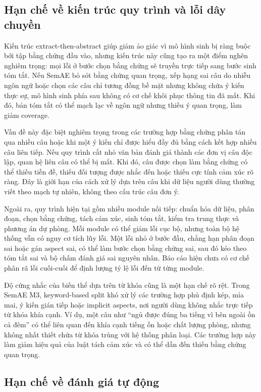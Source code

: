 \subsection{Hạn chế về kiến trúc quy trình và lỗi dây chuyền}

Kiến trúc extract-then-abstract giúp giảm ảo giác vì mô hình sinh bị ràng buộc bởi tập bằng chứng đầu vào, nhưng kiến trúc này cũng tạo ra một điểm nghẽn nghiêm trọng: mọi lỗi ở bước chọn bằng chứng sẽ truyền trực tiếp sang bước sinh tóm tắt. Nếu SemAE bỏ sót bằng chứng quan trọng, xếp hạng sai câu do nhiễu ngôn ngữ hoặc chọn các câu chỉ tương đồng bề mặt nhưng không chứa ý kiến thực sự, mô hình sinh phía sau không có cơ chế khôi phục thông tin đã mất. Khi đó, bản tóm tắt có thể mạch lạc về ngôn ngữ nhưng thiếu ý quan trọng, làm giảm coverage.

Vấn đề này đặc biệt nghiêm trọng trong các trường hợp bằng chứng phân tán qua nhiều câu hoặc khi một ý kiến chỉ được hiểu đầy đủ bằng cách kết hợp nhiều câu liên tiếp. Nếu quy trình cắt nhỏ văn bản đánh giá thành các đơn vị câu độc lập, quan hệ liên câu có thể bị mất. Khi đó, câu được chọn làm bằng chứng có thể thiếu tiền đề, thiếu đối tượng được nhắc đến hoặc thiếu cực tính cảm xúc rõ ràng. Đây là giới hạn của cách xử lý dựa trên câu khi dữ liệu người dùng thường viết theo mạch tự nhiên, không theo cấu trúc câu đơn ý.

Ngoài ra, quy trình hiện tại gồm nhiều module nối tiếp: chuẩn hóa dữ liệu, phân đoạn, chọn bằng chứng, tách cảm xúc, sinh tóm tắt, kiểm tra trung thực và phương án dự phòng. Mỗi module có thể giảm lỗi cục bộ, nhưng toàn bộ hệ thống vẫn có nguy cơ tích lũy lỗi. Một lỗi nhỏ ở bước đầu, chẳng hạn phân đoạn sai hoặc gán aspect sai, có thể làm bước chọn bằng chứng sai, sau đó kéo theo tóm tắt sai và bộ chấm đánh giá sai nguyên nhân. Báo cáo hiện chưa có cơ chế phân rã lỗi cuối-cuối để định lượng tỷ lệ lỗi đến từ từng module.

Độ cứng nhắc của biến thể dựa trên từ khóa cũng là một hạn chế rõ rệt. Trong SemAE M3, keyword-based split khó xử lý các trường hợp phủ định kép, mỉa mai, ý kiến gián tiếp hoặc implicit aspects, nơi người dùng không nhắc trực tiếp từ khóa khía cạnh. Ví dụ, một câu như ``ngủ được đúng ba tiếng vì bên ngoài ồn cả đêm'' có thể liên quan đến khía cạnh tiếng ồn hoặc chất lượng phòng, nhưng không nhất thiết chứa từ khóa trùng với hệ thống phân loại. Các trường hợp này làm giảm hiệu quả của luật tách cảm xúc và có thể dẫn đến thiếu bằng chứng quan trọng.

\subsection{Hạn chế về đánh giá tự động}

